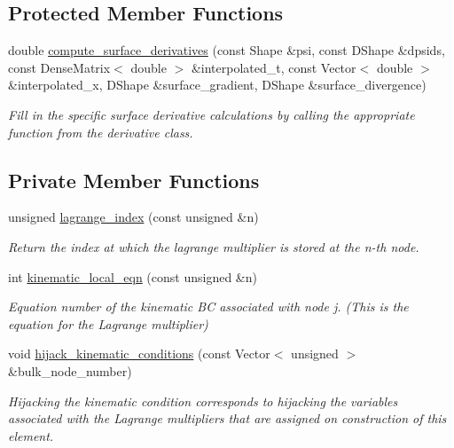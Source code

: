 \subsection*{Protected Member Functions}
\begin{DoxyCompactItemize}
\item 
double \hyperlink{classoomph_1_1ElasticUpdateFluidInterfaceElement_ae9df6c11ccb63dc04c0d5ca655fe1482}{compute\+\_\+surface\+\_\+derivatives} (const Shape \&psi, const D\+Shape \&dpsids, const Dense\+Matrix$<$ double $>$ \&interpolated\+\_\+t, const Vector$<$ double $>$ \&interpolated\+\_\+x, D\+Shape \&surface\+\_\+gradient, D\+Shape \&surface\+\_\+divergence)
\begin{DoxyCompactList}\small\item\em Fill in the specific surface derivative calculations by calling the appropriate function from the derivative class. \end{DoxyCompactList}\end{DoxyCompactItemize}
\subsection*{Private Member Functions}
\begin{DoxyCompactItemize}
\item 
unsigned \hyperlink{classoomph_1_1ElasticUpdateFluidInterfaceElement_a2eb4fbe50ac4ff1e9b26e0e1d8ff3186}{lagrange\+\_\+index} (const unsigned \&n)
\begin{DoxyCompactList}\small\item\em Return the index at which the lagrange multiplier is stored at the n-\/th node. \end{DoxyCompactList}\item 
int \hyperlink{classoomph_1_1ElasticUpdateFluidInterfaceElement_a940840693906b7b8d619ff97f521c811}{kinematic\+\_\+local\+\_\+eqn} (const unsigned \&n)
\begin{DoxyCompactList}\small\item\em Equation number of the kinematic BC associated with node j. (This is the equation for the Lagrange multiplier) \end{DoxyCompactList}\item 
void \hyperlink{classoomph_1_1ElasticUpdateFluidInterfaceElement_ae82f486496a0647d905ab6ee857de0d0}{hijack\+\_\+kinematic\+\_\+conditions} (const Vector$<$ unsigned $>$ \&bulk\+\_\+node\+\_\+number)
\begin{DoxyCompactList}\small\item\em Hijacking the kinematic condition corresponds to hijacking the variables associated with the Lagrange multipliers that are assigned on construction of this element. \end{DoxyCompactList}\end{DoxyCompactItemize}

